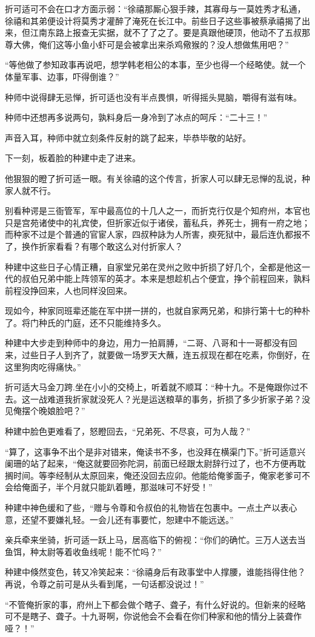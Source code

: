 折可适可不会在口才方面示弱：“徐禧那厮心狠手辣，其寡母与一莫姓秀才私通，徐禧和其弟便设计将莫秀才灌醉了淹死在长江中。前些日子这些事被蔡承禧揭了出来，但江南东路上报查无实据，就不了了之了。要是真跟他硬顶，他动不了五叔那尊大佛，俺们这等小鱼小虾可是会被拿出来杀鸡儆猴的？没人想做焦用吧？”

“等他做了参知政事再说吧，想学韩老相公的本事，至少也得一个经略使。就一个体量军事、边事，吓得倒谁？”

种师中说得肆无忌惮，折可适也没有半点畏惧，听得摇头晃脑，嚼得有滋有味。

种师中还想再多说两句，孰料身后一身冷到了冰点的呵斥：“二十三！”

声音入耳，种师中就立刻条件反射的跳了起来，毕恭毕敬的站好。

下一刻，板着脸的种建中走了进来。

他狠狠的瞪了折可适一眼。有关徐禧的这个传言，折家人可以肆无忌惮的乱说，种家人就不行。

别看种谔是三衙管军，军中最高位的十几人之一，而折克行仅是个知府州，本官也只是宫苑诸使中的礼宾使，但折家近似于诸侯，蓄私兵，养死士，拥有一府之地；而种家不过是个普通的官宦人家，四叔种詠为人所害，瘐死狱中，最后连仇都报不了，换作折家看看？有哪个敢这么对付折家人？

种建中这些日子心情正糟，自家堂兄弟在灵州之败中折损了好几个，全都是他这一代的叔伯兄弟中能上阵领军的英才。本来是想趁机占个便宜，挣个前程回来，孰料前程没挣回来，人也同样没回来。

现如今，种家同班辈还能在军中拼一拼的，也就自家两兄弟，和排行第十七的种朴了。将门种氏的门庭，还不只能维持多久。

种建中大步走到种师中的身边，用力一拍肩膊，“二哥、八哥和十一哥都没有回来，过些日子人到齐了，就要做一场罗天大蘸，连五叔现在都在吃素，你倒好，在这里狗肉吃得痛快。”

折可适大马金刀跨.坐在小小的交椅上，听着就不顺耳：“种十九。不是俺跟你过不去。这一战难道我折家就没死人？光是运送粮草的事务，折损了多少折家子弟？没见俺摆个晚娘脸吧？”

种建中脸色更难看了，怒瞪回去，“兄弟死、不尽哀，可为人哉？”

“算了，这事争不出个是非对错来，俺读书不多，也没拜在横渠门下。”折可适意兴阑珊的站了起来，“俺这就要回弥陀洞，前面已经跟太尉辞行过了，也不方便再耽搁时间。等李经制从太原回来，俺还没回去应卯。他能给俺爹面子，俺家老爹可不会给俺面子，半个月就只能趴着睡，那滋味可不好受！”

种建中神色缓和了些，“赠与令尊和令叔伯的礼物皆在包裹中。一点土产以表心意，还望不要嫌礼轻。一会儿还有事要忙，恕建中不能远送。”

亲兵牵来坐骑，折可适一跃上马，居高临下的俯视：“你们的确忙。三万人送去当鱼饵，种太尉等着收鱼线呢！能不忙吗？”

种建中倏然变色，转又冷笑起来：“徐禧身后有政事堂中人撑腰，谁能挡得住他？再说，令尊之前可是从头看到尾，一句话都没说过！”

“不管俺折家的事，府州上下都会做个瞎子、聋子，有什么好说的。但新来的经略可不是瞎子、聋子。十九哥啊，你说他会不会看在你们种家和他的情分上装聋作哑？！”

